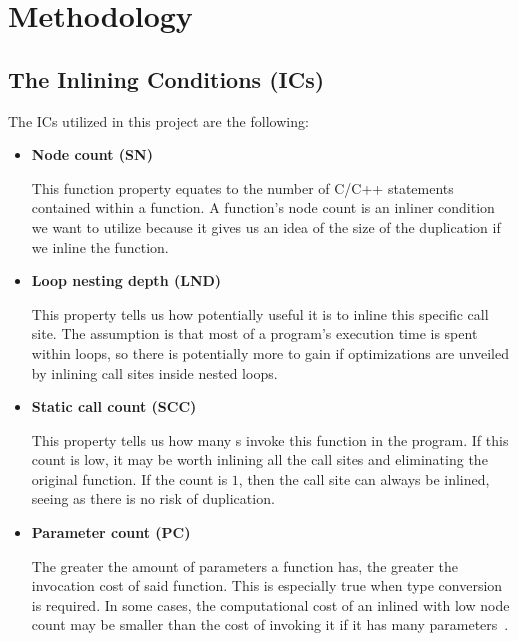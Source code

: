 
\clearpage
\section{Methodology}
\label{sec:methodology}


\subsection{The Inlining Conditions (ICs)}
\label{sub:meth:inlining_conditions}

The ICs utilized in this project are the following:

\begin{itemize}

	\item \textbf{Node count (SN)}

This function property equates to the number of C/C++ statements contained
within a function. A function's node count is an inliner condition we want
to utilize because it gives us an idea of the size of the  duplication if we
inline the function.

	\item \textbf{Loop nesting depth (LND)}

This property tells us how potentially useful it is to inline this specific call
site. The assumption is that most of a program's execution time is spent within
loops, so there is potentially more to gain if optimizations are unveiled by
inlining call sites inside nested loops.

	\item \textbf{Static call count (SCC)}

This property tells us how many \applyNode s invoke this function in the
program. If this count is low, it may be worth inlining all the call sites and
eliminating the original function. If the count is $1$, then the call site can
always be inlined, seeing as there is no risk of  duplication.

	\item \textbf{Parameter count (PC)}

The greater the amount of parameters a function has, the greater the invocation
cost of said function. This is especially true when type conversion is required.
In some cases, the computational cost of an inlined with low node count may
be smaller than the cost of invoking it if it has many
parameters~\cite{AdaptvCompilAndInlingWaterman}.


\end{itemize}
